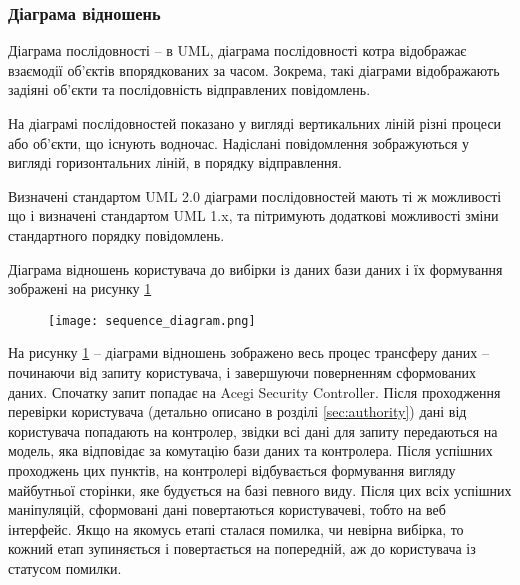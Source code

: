 \subsubsection{Діаграма відношень}
\par Діаграма послідовності -- в UML, діаграма послідовності котра відображає взаємодії об'єктів впорядкованих за часом. Зокрема, такі діаграми відображають задіяні об'єкти та послідовність відправлених повідомлень.
\par На діаграмі послідовностей показано у вигляді вертикальних ліній різні процеси або об'єкти, що існують водночас. Надіслані повідомлення зображуються у вигляді горизонтальних ліній, в порядку відправлення.
\par Визначені стандартом UML 2.0 діаграми послідовностей мають ті ж можливості що і визначені стандартом UML 1.x, та пітримують додаткові можливості зміни стандартного порядку повідомлень.
\par Діаграма відношень користувача до вибірки із даних бази даних і їх формування зображені на рисунку \ref{pic:sequence}

\begin{figure}[!ht]
\centering
		\texttt{[image: sequence\_diagram.png]}
		\label{pic:sequence}
\end{figure}
\par На рисунку \ref{pic:sequence} -- діаграми відношень зображено весь процес трансферу даних -- починаючи від запиту користувача, і завершуючи поверненням сформованих даних. Спочатку запит попадає на Acegi Security Controller. Після проходження перевірки користувача (детально описано в розділі \ref{sec:authority}) дані від користувача попадають на контролер, звідки всі дані для запиту передаються на модель, яка відповідає за комутацію бази даних та контролера. Після успішних проходжень цих пунктів, на контролері відбувається формування вигляду майбутньої сторінки, яке будується на базі певного виду. Після цих всіх успішних маніпуляцій, сформовані дані повертаються користувачеві, тобто на веб інтерфейс. Якщо на якомусь етапі сталася помилка, чи невірна вибірка, то кожний етап зупиняється і повертається на попередній, аж до користувача із статусом помилки.

